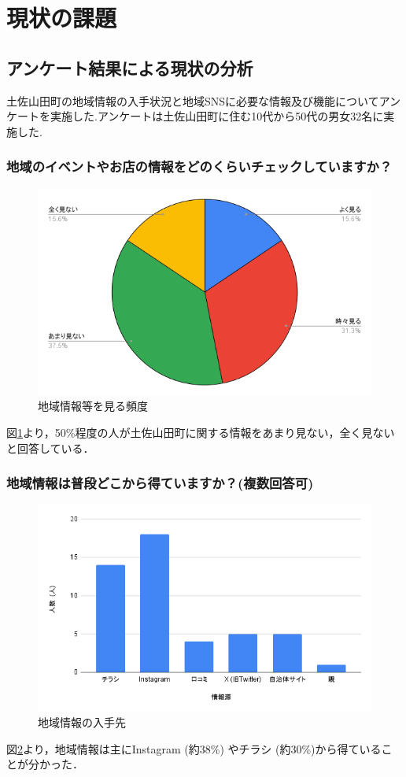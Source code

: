 \section{現状の課題}
\subsection{アンケート結果による現状の分析}
土佐山田町の地域情報の入手状況と地域SNSに必要な情報及び機能についてアンケートを実施した.アンケートは土佐山田町に住む10代から50代の男女32名に実施した.

\subsubsection{地域のイベントやお店の情報をどのくらいチェックしていますか？}
\begin{figure}[H]
    \centering
    \includegraphics[width=0.5\linewidth]{sections/fig125/Q1.png}
    \caption{地域情報等を見る頻度}
    \label{fig:Q1}
\end{figure}
図\ref{fig:Q1}より，50\%程度の人が土佐山田町に関する情報をあまり見ない，全く見ないと回答している．

\subsubsection{地域情報は普段どこから得ていますか？(複数回答可)}
\begin{figure}[H]
    \centering
    \includegraphics[width=0.5\linewidth]{sections/fig125/Q3.png}
    \caption{地域情報の入手先}
    \label{fig:Q3}
\end{figure}
図\ref{fig:Q3}より，地域情報は主にInstagram (約38\%) やチラシ (約30\%)から得ていることが分かった．

